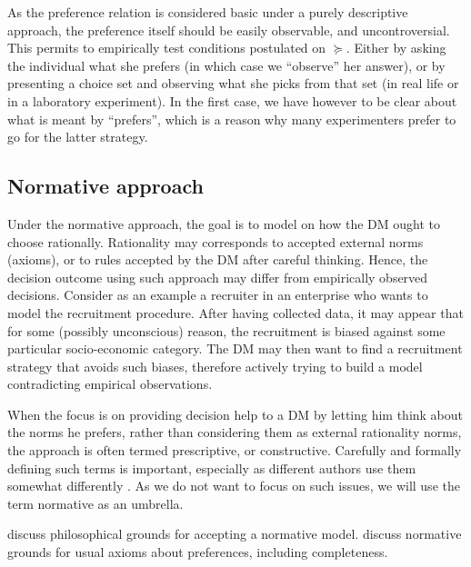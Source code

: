 \documentclass[french, english]{llncs}
\begin{document}
	As the preference relation is considered basic under a purely descriptive approach, the preference itself should be easily observable, and uncontroversial. This permits to empirically test conditions postulated on $\succeq$. Either by asking the individual what she prefers (in which case we “observe” her answer), or by presenting a choice set and observing what she picks from that set (in real life or in a laboratory experiment). In the first case, we have however to be clear about what is meant by “prefers”, which is a reason why many experimenters prefer to go for the latter strategy.
	
	\subsection{Normative approach}
	Under the normative approach, the goal is to model on how the \ac{DM} ought to choose rationally. Rationality may corresponds to accepted external norms (axioms), or to rules accepted by the \ac{DM} after careful thinking. Hence, the decision outcome using such approach may differ from empirically observed decisions. Consider as an example a recruiter in an enterprise who wants to model the recruitment procedure. After having collected data, it may appear that for some (possibly unconscious) reason, the recruitment is biased against some particular socio-economic category. The \ac{DM} may then want to find a recruitment strategy that avoids such biases, therefore actively trying to build a model contradicting empirical observations. 
	
	
	When the focus is on providing decision help to a \ac{DM} by letting him think about the norms he prefers, rather than considering them as external rationality norms, %
	the approach is often termed prescriptive, or constructive. Carefully and formally defining such terms is important, especially as different authors use them somewhat differently \citep{roy_decision_1993, tsoukias_concept_2007}. As we do not want to focus on such issues, we will use the term normative as an umbrella.

 \citet{mcclennen_rationality_1990, guala_logic_2000} discuss philosophical grounds for accepting a normative model. \citet{anand_are_1987, mandler_difficult_2001} discuss normative grounds for usual axioms about preferences, including completeness.
	
\end{document}
